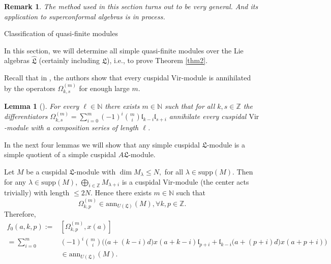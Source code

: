 \documentclass[1p]{elsarticle}
\numberwithin{equation}{section}
\def\fL{\mathfrak{L}}
\def\bN{\mathbb{N}}
\def\bZ{\mathbb{Z}}
\def\supp{\mathrm{supp}}
\def\ann{\mathrm{ann}}
\def\Vir{\mathrm{Vir}}
\def\fl{\mathfrak{l}}
\def\hL{\hat{\fL}}
\newtheorem{lemm}[theo]{Lemma}
\newtheorem{remark}[theo]{Remark}
\begin{document}
\begin{remark}The method used in this section turns out to be very general. %
 And its application to superconformal algebras is in process.\end{remark}



\begin{section}{Classification of quasi-finite modules}\end{section}

In this section, we will determine all simple    quasi-finite modules over the Lie algebras $\hL$ (certainly including $\fL$), i.e., to prove Theorem \ref{thm2}.

Recall that in \cite{BF}, the authors show that every cuspidal $\Vir$-module is annihilated by the operators $\Omega_{k,s}^{(m)}$ for enough large $m$.

\begin{lemm}[{\cite[Corollary 3.7]{BF}}]\label{Omegaoper}
For every $\ell\in\bN$ there exists $m\in\bN$ such that for all $k, s\in\bZ$ the differentiators $\Omega_{k, s}^{(m)}=\sum\limits_{i=0}^m(-1)^i\binom{m}{i}\fl_{k-i}\fl_{s+i}$ annihilate every cuspidal $\Vir$-module with a composition series of length $\ell$.
\end{lemm}

In the next four lemmas we will show that any simple cuspidal $\fL$-module is a simple quotient of a simple cuspidal $A\fL$-module.



Let $M$ be a cuspidal $\fL$-module with $\dim M_\lambda\leq N,$ for all $\lambda\in\supp(M)$. Then for any $\lambda\in\supp(M)$, $\bigoplus\limits_{i\in\bZ}M_{\lambda+i}$ is a cuspidal $\Vir$-module (the center acts trivially) with length $\leq 2N$. %
Hence there exists $m\in\bN$ such that $$\Omega_{k,p}^{(m)}\in \ann_{U(\fL)}(M), \forall k,p\in\bZ.$$ Therefore,
$$\begin{aligned}f_0(a,k,p):=&[\Omega_{k,p}^{(m)},x(a)]\\
	=
\sum\limits_{i=0}^{m}&(-1)^i\binom{m}{i}\Big(\big(a+(k-i)d\big)x(a+k-i)\fl_{p+i}+\fl_{k-i}\big(a+(p+i)d\big)x(a+p+i)\Big)\\ &\in \ann_{U(\fL)}(M).\end{aligned}$$
\end{document}
